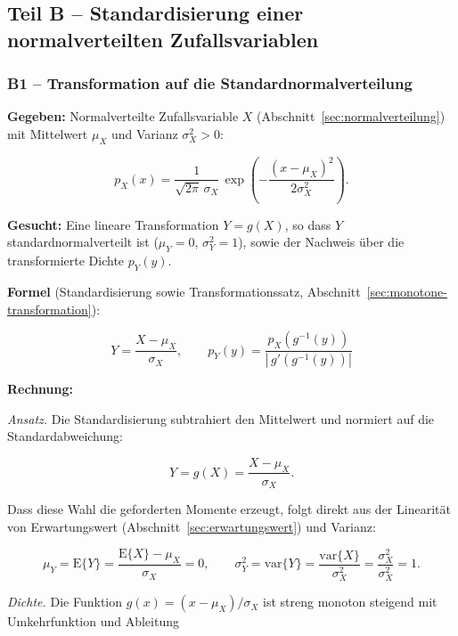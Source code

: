\subsection*{Teil B – Standardisierung einer normalverteilten Zufallsvariablen}

\subsubsection*{B1 – Transformation auf die Standardnormalverteilung}

\begin{beispiel}

\textbf{Gegeben:} Normalverteilte Zufallsvariable $X$
(Abschnitt~\ref{sec:normalverteilung}) mit Mittelwert $\mu_X$ und Varianz
$\sigma_X^2 > 0$:

$$
p_X(x) = \frac{1}{\sqrt{2\pi}\,\sigma_X}\,
         \exp\!\left(-\frac{(x - \mu_X)^2}{2\sigma_X^2}\right).
$$

\textbf{Gesucht:} Eine lineare Transformation $Y = g(X)$, so dass $Y$
standardnormalverteilt ist ($\mu_Y = 0$, $\sigma_Y^2 = 1$), sowie der Nachweis
über die transformierte Dichte $p_Y(y)$.

\textbf{Formel} (Standardisierung sowie Transformationssatz,
Abschnitt~\ref{sec:monotone-transformation}):

$$
Y = \frac{X - \mu_X}{\sigma_X}, \qquad
p_Y(y) = \frac{p_X\!\left(g^{-1}(y)\right)}{\left|\, g'\!\left(g^{-1}(y)\right)\right|}
$$

\textbf{Rechnung:}

\emph{Ansatz.} Die Standardisierung subtrahiert den Mittelwert und normiert auf
die Standardabweichung:

$$
Y = g(X) = \frac{X - \mu_X}{\sigma_X}.
$$

Dass diese Wahl die geforderten Momente erzeugt, folgt direkt aus der
Linearität von Erwartungswert (Abschnitt~\ref{sec:erwartungswert}) und Varianz:

$$
\mu_Y = \mathrm{E}\{Y\} = \frac{\mathrm{E}\{X\} - \mu_X}{\sigma_X} = 0,
\qquad
\sigma_Y^2 = \mathrm{var}\{Y\} = \frac{\mathrm{var}\{X\}}{\sigma_X^2}
           = \frac{\sigma_X^2}{\sigma_X^2} = 1.
$$

\emph{Dichte.} Die Funktion $g(x) = (x - \mu_X)/\sigma_X$ ist streng monoton
steigend mit Umkehrfunktion und Ableitung


\end{beispiel}
